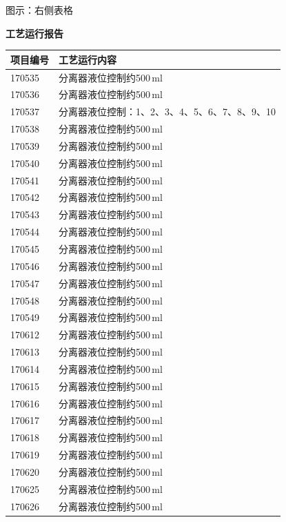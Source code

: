 \documentclass[UTF8,10pt,a4paper,fontset=fandol]{ctexart}
\begin{document}
\begin{center}
\begin{minipage}[t]{0.47\textwidth}
\medskip
\scriptsize
图示：右侧表格
\end{minipage}

\vfill

\begin{minipage}[t]{0.47\textwidth}
\centering
\textbf{工艺运行报告}

\smallskip
\begin{tabularx}{\textwidth}{|p{}|X|}
\hline
\textbf{项目编号} & \textbf{工艺运行内容} \\ \hline
170535 & 分离器液位控制约500\,ml \\ \hline
170536 & 分离器液位控制约500\,ml \\ \hline
170537 & 分离器液位控制：1、2、3、4、5、6、7、8、9、10 \\ \hline
170538 & 分离器液位控制约500\,ml \\ \hline
170539 & 分离器液位控制约500\,ml \\ \hline
170540 & 分离器液位控制约500\,ml \\ \hline
170541 & 分离器液位控制约500\,ml \\ \hline
170542 & 分离器液位控制约500\,ml \\ \hline
170543 & 分离器液位控制约500\,ml \\ \hline
170544 & 分离器液位控制约500\,ml \\ \hline
170545 & 分离器液位控制约500\,ml \\ \hline
170546 & 分离器液位控制约500\,ml \\ \hline
170547 & 分离器液位控制约500\,ml \\ \hline
170548 & 分离器液位控制约500\,ml \\ \hline
170549 & 分离器液位控制约500\,ml \\ \hline
170612 & 分离器液位控制约500\,ml \\ \hline
170613 & 分离器液位控制约500\,ml \\ \hline
170614 & 分离器液位控制约500\,ml \\ \hline
170615 & 分离器液位控制约500\,ml \\ \hline
170616 & 分离器液位控制约500\,ml \\ \hline
170617 & 分离器液位控制约500\,ml \\ \hline
170618 & 分离器液位控制约500\,ml \\ \hline
170619 & 分离器液位控制约500\,ml \\ \hline
170620 & 分离器液位控制约500\,ml \\ \hline
170625 & 分离器液位控制约500\,ml \\ \hline
170626 & 分离器液位控制约500\,ml \\ \hline
\end{tabularx}


\end{minipage}
\end{center}
\end{document}
